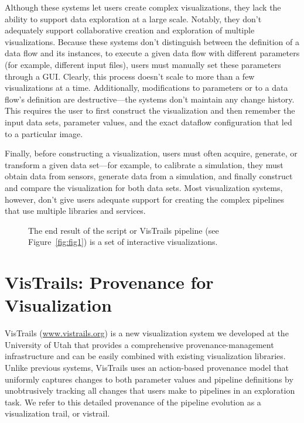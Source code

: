 \documentclass[11pt,twocolumn]{article}
\begin{document}
Although these systems let users create complex visualizations, they
lack the ability to support data exploration at a large scale.
Notably, they don’t adequately support collaborative creation and
exploration of multiple visualizations. Because these systems don’t
distinguish between the definition of a data flow and its instances,
to execute a given data flow with different parameters (for example,
different input files), users must manually set these parameters
through a GUI. Clearly, this process doesn’t scale to more than a few
visualizations at a time. Additionally, modifications to parameters or
to a data flow’s definition are destructive—the systems don’t maintain
any change history. This requires the user to first construct the
visualization and then remember the input data sets, parameter values,
and the exact dataflow configuration that led to a particular image.


Finally, before constructing a visualization, users must often
acquire, generate, or transform a given data set—for example, to
calibrate a simulation, they must obtain data from sensors, generate
data from a simulation, and finally construct and compare the
visualization for both data sets. Most visualization systems, however,
don’t give users adequate support for creating the complex pipelines
that use multiple libraries and services.

\begin{figure}[t]
\caption{The end result of the script or VisTrails pipeline (see
  Figure~\ref{fig:fig1}) is a set of interactive visualizations.}
\label{fig:histogram}
\end{figure}

\section{VisTrails: Provenance for Visualization}
VisTrails (\url{www.vistrails.org}) is a new visualization system we
developed at the University of Utah that provides a comprehensive
provenance-management infrastructure and can be easily combined with
existing visualization libraries. Unlike previous systems, VisTrails
uses an action-based provenance model that uniformly captures changes
to both parameter values and pipeline definitions by unobtrusively
tracking all changes that users make to pipelines in an exploration
task. We refer to this detailed provenance of the pipeline evolution
as a visualization trail, or vistrail. 
\end{document}
